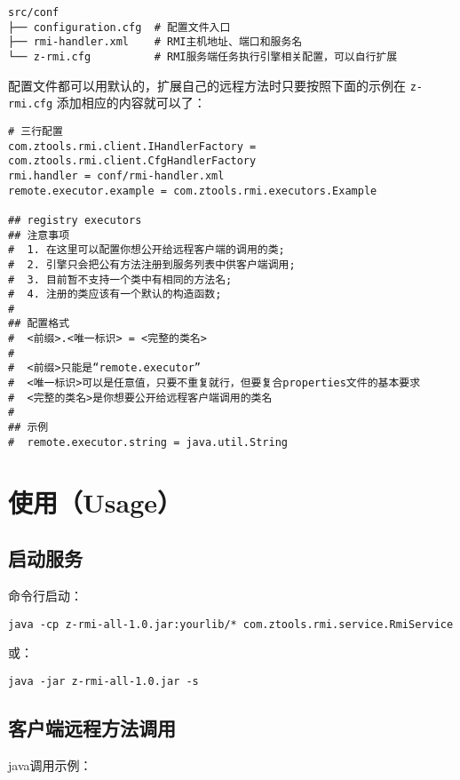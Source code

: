 \documentclass[11pt]{article}
\begin{document}
\begin{verbatim}
src/conf
├── configuration.cfg  # 配置文件入口
├── rmi-handler.xml    # RMI主机地址、端口和服务名
└── z-rmi.cfg          # RMI服务端任务执行引擎相关配置，可以自行扩展
\end{verbatim}

配置文件都可以用默认的，扩展自己的远程方法时只要按照下面的示例在
\texttt{z-rmi.cfg} 添加相应的内容就可以了：

\begin{verbatim}
# 三行配置
com.ztools.rmi.client.IHandlerFactory = com.ztools.rmi.client.CfgHandlerFactory
rmi.handler = conf/rmi-handler.xml
remote.executor.example = com.ztools.rmi.executors.Example

## registry executors
## 注意事项
#  1. 在这里可以配置你想公开给远程客户端的调用的类;
#  2. 引擎只会把公有方法注册到服务列表中供客户端调用;
#  3. 目前暂不支持一个类中有相同的方法名;
#  4. 注册的类应该有一个默认的构造函数;
#
## 配置格式
#  <前缀>.<唯一标识> = <完整的类名>
#
#  <前缀>只能是“remote.executor”
#  <唯一标识>可以是任意值，只要不重复就行，但要复合properties文件的基本要求
#  <完整的类名>是你想要公开给远程客户端调用的类名
#
## 示例
#  remote.executor.string = java.util.String
\end{verbatim}

\section{使用（Usage）}
\label{sec:orgheadline9}

\subsection{启动服务}
\label{sec:orgheadline7}
命令行启动：

\begin{verbatim}
java -cp z-rmi-all-1.0.jar:yourlib/* com.ztools.rmi.service.RmiService
\end{verbatim}

或：

\begin{verbatim}
java -jar z-rmi-all-1.0.jar -s
\end{verbatim}

\subsection{客户端远程方法调用}
\label{sec:orgheadline8}
java调用示例：
\end{document}
